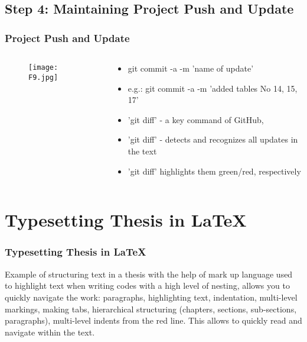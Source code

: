 \documentclass[pdflatex,compress,8pt,
	xcolor={dvipsnames,dvipsnames,svgnames,x11names,table},
	hyperref={
	breaklinks = true, 
	pdfauthor={Lemenkova Polina}, 
	pdfsubject={Preentation}, 
	pdfcreator={Lemenkova Polina}, 
	pdfproducer={Lemenkova Polina}, 
	colorlinks=true,linkcolor=blue, 
	citecolor=NavyBlue, 
	urlcolor = NavyBlue, 
	breaklinks = true}]{beamer}
\begin{document}
\subsection{Step 4: Maintaining Project Push and Update}
\begin{frame}\frametitle{Project Push and Update}
\begin{minipage}[0.4\textheight]{\textwidth}
\begin{columns}[T]
\begin{column}{0.5\textwidth}
\vspace{2em}
\begin{figure}[H]
	\centering
		\texttt{[image: F9.jpg]}
\end{figure}
\end{column}
\begin{column}{0.5\textwidth}
\vspace{4em} 
\begin{itemize}
	\item git commit -a -m 'name of update'
	\item e.g.: git commit -a -m 'added tables No 14, 15, 17'
	\item 'git diff' - a key command of GitHub,	
	\item 'git diff' - detects and recognizes all updates in the text 
	\item 'git diff' highlights them green/red, respectively
\end{itemize}
\end{column}
\end{columns}
\end{minipage}
\end{frame}

\section{Typesetting Thesis in \LaTeX}
\begin{frame}\frametitle{Typesetting Thesis in \LaTeX}
\vspace{1em}
Example of structuring text in a thesis with the help of mark up language used to highlight text when writing codes with a high level of nesting, allows you to quickly navigate the work: paragraphs, highlighting text, indentation, multi-level markings, making tabs, hierarchical structuring (chapters, sections, sub-sections, paragraphs), multi-level indents from the red line. This allows to quickly read and navigate within the text.
\begin{figure}[H]
	\centering
			\hspace{1mm}
\end{figure}
\end{frame}
\end{document}
